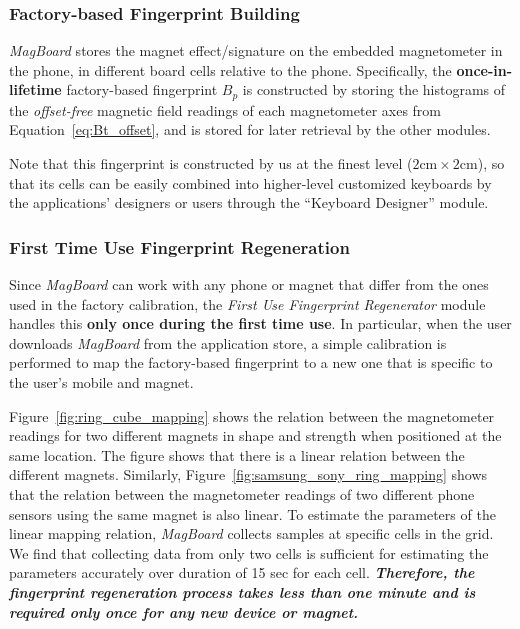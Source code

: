 \documentclass[conference]{IEEEtran}
\def \sys {\textit{MagBoard}}
\begin{document}
\subsubsection{Factory-based Fingerprint Building}

\sys{} stores the magnet effect/signature on the embedded magnetometer in the phone, in different board cells relative to the phone. Specifically, the \textbf{once-in-lifetime} factory-based fingerprint $B_p$ is constructed by storing the histograms of the \emph{offset-free} magnetic field readings of each magnetometer axes from Equation~\ref{eq:Bt_offset}, and is stored for later retrieval by the other modules. 

Note that this fingerprint is constructed by us at the finest level ($2\textrm{cm}\times2\textrm{cm}$), so that its cells can be easily combined into higher-level customized keyboards by the applications' designers or users through the ``Keyboard Designer'' module.

\subsubsection{First Time Use Fingerprint Regeneration}

Since \sys{} can work with any phone or magnet that differ from the ones used in the factory calibration, the \textit{First Use Fingerprint Regenerator} module handles this \textbf{only once during the first time use}. In particular, when the user downloads \sys{} from the application store, a simple calibration is performed to map the factory-based fingerprint to a new one that is specific to the user's mobile and magnet.

Figure~\ref{fig:ring_cube_mapping} shows the relation between the magnetometer readings for two different magnets in shape and strength when positioned at the same location. The figure shows that there is a linear relation between the different magnets. 
Similarly, Figure~\ref{fig:samsung_sony_ring_mapping} shows that the relation between the magnetometer readings of two different phone sensors using the same magnet is also linear. 
To estimate the parameters of the linear mapping relation, \sys{} collects samples at specific cells in the grid. We find that collecting data from only two cells is sufficient for estimating the parameters accurately over duration of 15 sec for each cell.
\textbf{\emph{Therefore, the fingerprint regeneration process takes less than one minute and is required only once for any new device or magnet.}}
\end{document}
